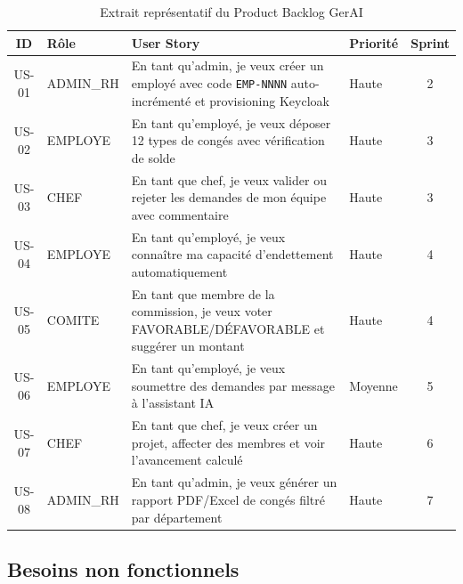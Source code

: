 \begin{table}[H]
\centering
\caption{Extrait représentatif du Product Backlog GerAI}
\label{tab:pbl}
\begin{tabularx}{\textwidth}{|C|l|L|l|C|}
\hline
{}\textbf{ID} & \textbf{Rôle} & \textbf{User Story} & \textbf{Priorité} & \textbf{Sprint} \\\hline
{}
US-01 & ADMIN\_RH & En tant qu'admin, je veux créer un employé avec code \texttt{EMP-NNNN} auto-incrémenté et provisioning Keycloak & Haute & 2 \\\hline
US-02 & EMPLOYE & En tant qu'employé, je veux déposer 12 types de congés avec vérification de solde & Haute & 3 \\\hline
{}
US-03 & CHEF & En tant que chef, je veux valider ou rejeter les demandes de mon équipe avec commentaire & Haute & 3 \\\hline
US-04 & EMPLOYE & En tant qu'employé, je veux connaître ma capacité d'endettement automatiquement & Haute & 4 \\\hline
{}
US-05 & COMITE & En tant que membre de la commission, je veux voter FAVORABLE/DÉFAVORABLE et suggérer un montant & Haute & 4 \\\hline
US-06 & EMPLOYE & En tant qu'employé, je veux soumettre des demandes par message à l'assistant IA & Moyenne & 5 \\\hline
{}
US-07 & CHEF & En tant que chef, je veux créer un projet, affecter des membres et voir l'avancement calculé & Haute & 6 \\\hline
US-08 & ADMIN\_RH & En tant qu'admin, je veux générer un rapport PDF/Excel de congés filtré par département & Haute & 7 \\\hline
\end{tabularx}
\end{table}

\subsection{Besoins non fonctionnels}

